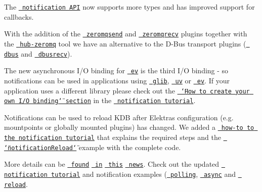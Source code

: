 \begin{DoxyItemize}
\item The \href{https://doc.libelektra.org/api/current/html/group__kdbnotification.html}{\texttt{ notification A\+PI}} now supports more types and has improved support for callbacks.
\item With the addition of the \href{https://www.libelektra.org/plugins/zeromqsend}{\texttt{ zeromqsend}} and \href{https://www.libelektra.org/plugins/zeromqrecv}{\texttt{ zeromqrecv}} plugins together with the \href{https://www.libelektra.org/tools/hub-zeromq}{\texttt{ hub-\/zeromq}} tool we have an alternative to the D-\/\+Bus transport plugins (\href{https://www.libelektra.org/plugins/dbus}{\texttt{ dbus}} and \href{https://www.libelektra.org/plugins/dbusrecv}{\texttt{ dbusrecv}}).
\item The new asynchronous I/O binding for \href{https://www.libelektra.org/bindings/io_ev}{\texttt{ ev}} is the third I/O binding -\/ so notifications can be used in applications using \href{https://www.libelektra.org/bindings/io_glib}{\texttt{ glib}}, \href{https://www.libelektra.org/bindings/io_uv}{\texttt{ uv}} or \href{https://www.libelektra.org/bindings/io_ev}{\texttt{ ev}}. If your application uses a different library please check out the \href{https://www.libelektra.org/tutorials/notifications\#how-to-create-your-own-i-o-binding}{\texttt{ \char`\"{}\+How to create your own I/\+O binding\char`\"{} section}} in the \href{https://www.libelektra.org/tutorials/notifications}{\texttt{ notification tutorial}}.
\item Notifications can be used to reload K\+DB after Elektra\textquotesingle{}s configuration (e.\+g. mountpoints or globally mounted plugins) has changed. We added a \href{https://www.libelektra.org/tutorials/notifications\#howto-reload-kdb-when-elektras-configuration-has-changed}{\texttt{ how-\/to to the notification tutorial}} that explains the required steps and the \href{https://www.libelektra.org/examples/notificationreload}{\texttt{ \char`\"{}notification\+Reload\char`\"{}}} example with the complete code.
\end{DoxyItemize}

More details can be \href{\#zeromq-transport-plugins}{\texttt{ found}} \href{\#misc}{\texttt{ in}} \href{\#bindings}{\texttt{ this}} \href{\#notifications}{\texttt{ news}}. Check out the updated \href{https://www.libelektra.org/tutorials/notifications}{\texttt{ notification tutorial}} and notification examples (\href{https://www.libelektra.org/examples/notificationpolling}{\texttt{ polling}}, \href{https://www.libelektra.org/examples/notificationasync}{\texttt{ async}} and \href{https://www.libelektra.org/examples/notificationreload}{\texttt{ reload}}.

